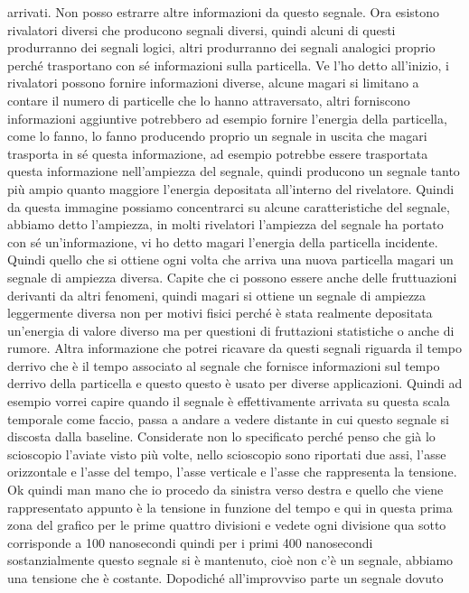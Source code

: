 arrivati. Non posso estrarre altre informazioni da questo segnale. Ora esistono rivalatori diversi che producono segnali diversi, quindi alcuni di questi produrranno dei segnali logici, altri produrranno dei segnali analogici proprio perché trasportano con sé informazioni sulla particella. Ve l'ho detto all'inizio, i rivalatori possono fornire informazioni diverse, alcune magari si limitano a contare il numero di particelle che lo hanno attraversato, altri forniscono informazioni aggiuntive potrebbero ad esempio fornire l'energia della particella, come lo fanno, lo fanno producendo proprio un segnale in uscita che magari trasporta in sé questa informazione, ad esempio potrebbe essere trasportata questa informazione nell'ampiezza del segnale, quindi producono un segnale tanto più ampio quanto maggiore l'energia depositata all'interno del rivelatore. Quindi da questa immagine possiamo concentrarci su alcune caratteristiche del segnale, abbiamo detto l'ampiezza, in molti rivelatori l'ampiezza del segnale ha portato con sé un'informazione, vi ho detto magari l'energia della particella incidente. Quindi quello che si ottiene ogni volta che arriva una nuova particella magari un segnale di ampiezza diversa. Capite che ci possono essere anche delle fruttuazioni derivanti da altri fenomeni, quindi magari si ottiene un segnale di ampiezza leggermente diversa non per motivi fisici perché è stata realmente depositata un'energia di valore diverso ma per questioni di fruttazioni statistiche o anche di rumore. Altra informazione che potrei ricavare da questi segnali riguarda il tempo derrivo che è il tempo associato al segnale che fornisce informazioni sul tempo derrivo della particella e questo questo è usato per diverse applicazioni. Quindi ad esempio vorrei capire quando il segnale è effettivamente arrivata su questa scala temporale come faccio, passa a andare a vedere distante in cui questo segnale si discosta dalla baseline. Considerate non lo specificato perché penso che già lo scioscopio l'aviate visto più volte, nello scioscopio sono riportati due assi, l'asse orizzontale e l'asse del tempo, l'asse verticale e l'asse che rappresenta la tensione. Ok quindi man mano che io procedo da sinistra verso destra e quello che viene rappresentato appunto è la tensione in funzione del tempo e qui in questa prima zona del grafico per le prime quattro divisioni e vedete ogni divisione qua sotto corrisponde a 100 nanosecondi quindi per i primi 400 nanosecondi sostanzialmente questo segnale si è mantenuto, cioè non c'è un segnale, abbiamo una tensione che è costante. Dopodiché all'improvviso parte un segnale dovuto

